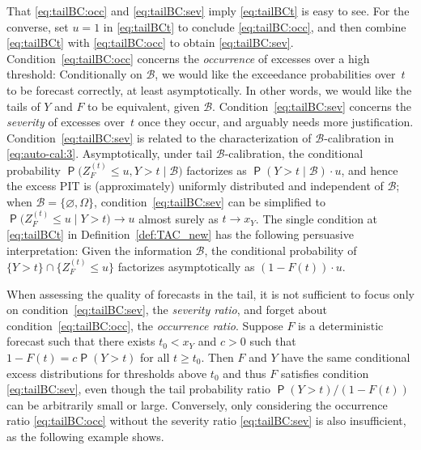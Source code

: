 \documentclass[12pt]{article}
\newcommand{\Q}{\operatorname{\mathsf{P}}}
\newcommand{\Bb}{\mathcal{B}}
\newcommand{\1}{\mathbf{1}} %
\newcommand{\ZFt}{Z_{F}^{(t)}} %
\theoremstyle{definition}
\begin{document}
That \eqref{eq:tailBC:occ} and \eqref{eq:tailBC:sev} imply \eqref{eq:tailBCt} is easy to see. For the converse, set $u = 1$ in \eqref{eq:tailBCt} to conclude \eqref{eq:tailBC:occ}, and then combine \eqref{eq:tailBCt} with \eqref{eq:tailBC:occ} to obtain \eqref{eq:tailBC:sev}. Condition~\eqref{eq:tailBC:occ} concerns the \emph{occurrence} of excesses over a high threshold: Conditionally on $\Bb$, we would like the exceedance probabilities over~$t$ to be forecast correctly, at least asymptotically. In other words, we would like the tails of $Y$ and $F$ to be equivalent, given $\Bb$. Condition~\eqref{eq:tailBC:sev} concerns the \emph{severity} of excesses over~$t$ once they occur, and arguably needs more justification. 
Condition~\eqref{eq:tailBC:sev} is related to the characterization of $\Bb$-calibration in \eqref{eq:auto-cal:3}. Asymptotically, under tail $\Bb$-calibration, the conditional probability $\Q\bigl(\ZFt \le u, Y > t \mid \Bb\bigr)$ factorizes as $\Q(Y>t\mid \Bb) \cdot u$, and hence the excess PIT is (approximately) uniformly distributed and independent of $\Bb$; when $\Bb = \{\varnothing, \Omega\}$, condition~\eqref{eq:tailBC:sev} can be simplified to $\Q\bigl(\ZFt \le u \mid Y > t \bigr)\to u$ almost surely as $t \to x_Y$. The single condition at \eqref{eq:tailBCt} in Definition~\ref{def:TAC_new} has the following persuasive interpretation: Given the information $\Bb$, the conditional probability of $\{Y > t\} \cap \{\ZFt \le u\}$ factorizes asymptotically as $(1-F(t)) \cdot u$.

When assessing the quality of forecasts in the tail, it is not sufficient to focus only on condition~\eqref{eq:tailBC:sev}, the \emph{severity ratio}, and forget about condition~\eqref{eq:tailBC:occ}, the \emph{occurrence ratio}. Suppose $F$ is a deterministic forecast such that there exists $t_0 < x_Y$ and $c > 0$ such that $1 - F(t) = c \Q(Y > t)$ for all $t \ge t_0$. Then $F$ and $Y$ have the same conditional excess distributions for thresholds above $t_0$ and thus $F$ satisfies condition \eqref{eq:tailBC:sev}, even though the tail probability ratio $\Q(Y > t) / (1-F(t))$ can be arbitrarily small or large. Conversely, only considering the occurrence ratio \eqref{eq:tailBC:occ} without the severity ratio \eqref{eq:tailBC:sev} is also insufficient, as the following example shows.
\end{document}
